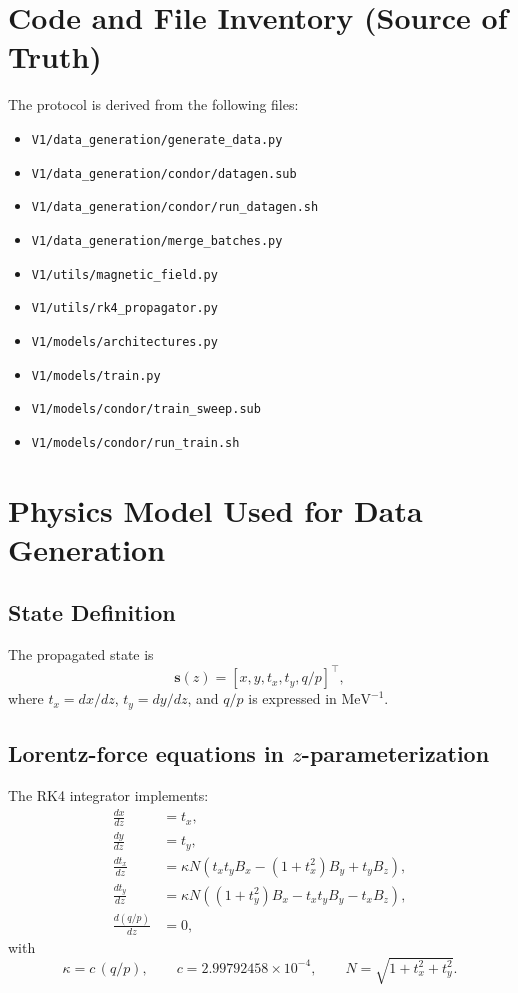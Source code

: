 \documentclass[11pt,a4paper]{article}
\begin{document}
\section{Code and File Inventory (Source of Truth)}
The protocol is derived from the following files:
\begin{itemize}[leftmargin=*]
  \item \texttt{V1/data\_generation/generate\_data.py}
  \item \texttt{V1/data\_generation/condor/datagen.sub}
  \item \texttt{V1/data\_generation/condor/run\_datagen.sh}
  \item \texttt{V1/data\_generation/merge\_batches.py}
  \item \texttt{V1/utils/magnetic\_field.py}
  \item \texttt{V1/utils/rk4\_propagator.py}
  \item \texttt{V1/models/architectures.py}
  \item \texttt{V1/models/train.py}
  \item \texttt{V1/models/condor/train\_sweep.sub}
  \item \texttt{V1/models/condor/run\_train.sh}
\end{itemize}

\section{Physics Model Used for Data Generation}
\subsection{State Definition}
The propagated state is
\begin{equation}
\mathbf{s}(z) = [x, y, t_x, t_y, q/p]^\top,
\end{equation}
where $t_x = dx/dz$, $t_y = dy/dz$, and $q/p$ is expressed in $\mathrm{MeV}^{-1}$.

\subsection{Lorentz-force equations in $z$-parameterization}
The RK4 integrator implements:
\begin{align}
\frac{dx}{dz} &= t_x, \\
\frac{dy}{dz} &= t_y, \\
\frac{dt_x}{dz} &= \kappa N\left(t_x t_y B_x - (1+t_x^2)B_y + t_y B_z\right), \\
\frac{dt_y}{dz} &= \kappa N\left((1+t_y^2)B_x - t_x t_y B_y - t_x B_z\right), \\
\frac{d(q/p)}{dz} &= 0,
\end{align}
with
\begin{equation}
\kappa = c\,(q/p), \qquad c = 2.99792458\times 10^{-4}, \qquad N = \sqrt{1+t_x^2+t_y^2}.
\end{equation}
\end{document}
